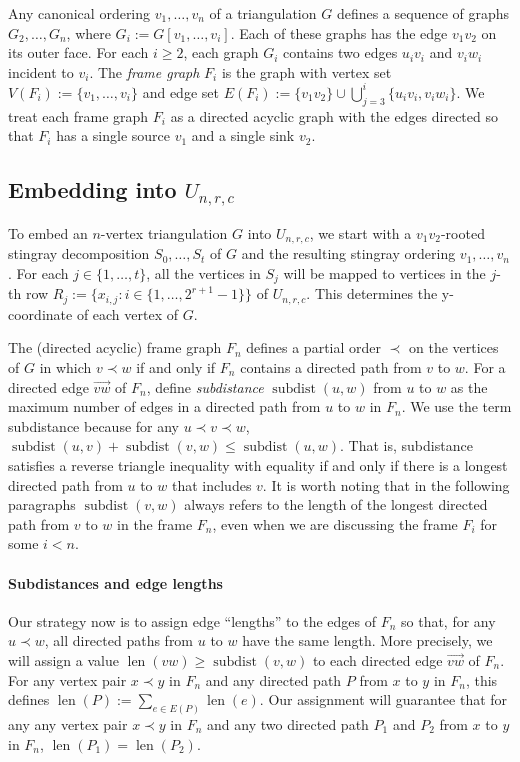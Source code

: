 \documentclass{patmorin}
\newcommand{\defin}[1]{\emph{\color{brightmaroon}#1}}
\DeclareMathOperator{\sd}{subdist}
\DeclareMathOperator{\len}{len}
\begin{document}
Any canonical ordering $v_1,\ldots,v_n$ of a triangulation $G$ defines a sequence of graphs $G_2,\ldots,G_n$, where $G_i:=G[v_1,\ldots,v_i]$.  Each of these graphs has the edge $v_1v_2$ on its outer face.  For each $i\ge 2$, each graph $G_i$ contains two edges $u_iv_i$ and $v_iw_i$ incident to $v_i$.   The \defin{frame graph} $F_i$ is the graph with vertex set $V(F_i):=\{v_1,\ldots,v_i\}$ and edge set $E(F_i):=\{v_1v_2\}\cup \bigcup_{j=3}^i\{u_iv_i,v_iw_i\}$.  We treat each frame graph $F_i$ as a directed acyclic graph with the edges directed so that $F_i$ has a single source $v_1$ and a single sink $v_2$.

\subsection{\boldmath Embedding into $U_{n,r,c}$}

To embed an $n$-vertex triangulation $G$ into $U_{n,r,c}$, we start with a $v_1v_2$-rooted stingray decomposition $S_0,\ldots,S_t$ of $G$ and the resulting stingray ordering $v_1,\ldots,v_n$.  For each $j\in\{1,\ldots,t\}$, all the vertices in $S_j$ will be mapped to vertices in the $j$-th row $R_j:=\{x_{i,j}:i\in\{1,\ldots,2^{r+1}-1\}\}$ of $U_{n,r,c}$.  This determines the y-coordinate of each vertex of $G$.

The (directed acyclic) frame graph $F_n$ defines a partial order $\prec$ on the vertices of $G$ in which $v\prec w$ if and only if $F_n$ contains a directed path from $v$ to $w$.  For a directed edge $\overrightarrow{vw}$ of $F_n$, define \defin{subdistance} $\sd(u,w)$ from $u$ to $w$ as the maximum number of edges in a directed path from $u$ to $w$ in $F_n$.  We use the term subdistance because for any $u\prec v\prec w$, $\sd(u,v)+\sd(v,w) \le \sd(u,w)$.  That is, subdistance satisfies a reverse triangle inequality with equality if and only if there is a longest directed path from $u$ to $w$ that includes $v$.  It is worth noting that in the following paragraphs $\sd(v,w)$ always refers to the length of the longest directed path from $v$ to $w$ in the frame $F_n$, even when we are discussing the frame $F_i$ for some $i<n$.

\paragraph{Subdistances and edge lengths}

Our strategy now is to assign edge ``lengths'' to the edges of $F_n$ so that, for any $u\prec w$, all directed paths from $u$ to $w$ have the same length.  More precisely, we will assign a value $\len(vw)\ge\sd(v,w)$ to each directed edge $\overrightarrow{vw}$ of $F_n$.  For any vertex pair $x\prec y$ in $F_n$ and any directed path $P$ from $x$ to $y$ in $F_n$, this defines $\len(P):=\sum_{e\in E(P)}\len(e)$.  Our assignment will guarantee that for any any vertex pair $x\prec y$ in $F_n$ and any two directed path $P_1$ and $P_2$ from $x$ to $y$ in $F_n$, $\len(P_1)=\len(P_2)$.
\end{document}
